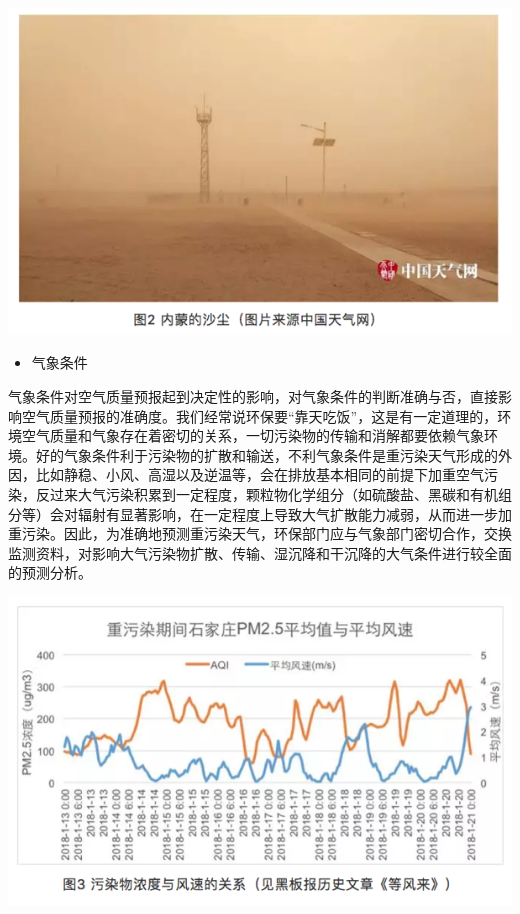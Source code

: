 \documentclass[]{book}
\providecommand{\tightlist}{%
  \setlength{\itemsep}{0pt}\setlength{\parskip}{0pt}}
\begin{document}
\includegraphics[width=8.33in]{images/kqyb2}

\begin{itemize}
\tightlist
\item
  气象条件
\end{itemize}

气象条件对空气质量预报起到决定性的影响，对气象条件的判断准确与否，直接影响空气质量预报的准确度。我们经常说环保要``靠天吃饭''，这是有一定道理的，环境空气质量和气象存在着密切的关系，一切污染物的传输和消解都要依赖气象环境。好的气象条件利于污染物的扩散和输送，不利气象条件是重污染天气形成的外因，比如静稳、小风、高湿以及逆温等，会在排放基本相同的前提下加重空气污染，反过来大气污染积累到一定程度，颗粒物化学组分（如硫酸盐、黑碳和有机组分等）会对辐射有显著影响，在一定程度上导致大气扩散能力减弱，从而进一步加重污染。因此，为准确地预测重污染天气，环保部门应与气象部门密切合作，交换监测资料，对影响大气污染物扩散、传输、湿沉降和干沉降的大气条件进行较全面的预测分析。

\includegraphics[width=8.33in]{images/kqyb3}
\end{document}

